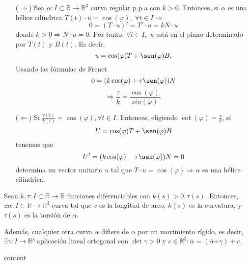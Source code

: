 \begin{dem}
  \begin{enumerate}[label=(\roman*)]
    \item []
    \item [($\Rightarrow$)] Sea $\alpha  : I \subset \mathbb{R} \to \mathbb{R}^{3}$ curva regular p.p.a con $k>0$. Entonces, si $\alpha$ es una hélice cilíndrica $T(t) \cdot u = \cos(\varphi), \; \forall t \in I \Rightarrow$
      \[ 
        0 = (T \cdot u)' = T' \cdot u = kN \cdot u
      \] 
      donde $k>0 \Rightarrow N \cdot u = 0$. Por tanto, $\forall t \in I,$ $u$ está en el plano determinado por $T(t)$ y $B(t)$. Es decir,
      \[ 
        u = \cos(\varphi)T + \sen(\varphi)B .
      \] 
      Usando las fórmulas de Frenet
      \[ 
        0 = (k \cos(\varphi) + \tau \sen(\varphi))N 
      \] 
      \[ 
        \Rightarrow \frac{\tau}{k} = \frac{\cos(\varphi)}{sin(\varphi)}.
      \] 
    \item [($\Leftarrow$)] Si $\frac{\tau(t)}{k(t)} = \cos(\varphi), \forall t \in I$. Entonces, eligiendo $\cot(\varphi) = \frac{\tau}{k}$, si
      \[ 
        U = \cos(\varphi)T + \sen(\varphi)B 
      \] 
      tenemos que
      \[ 
        U' = (k \cos(\varphi) - \tau \sen(\varphi))N = 0 
      \] 
      determina un vector unitario $u$ tal que $T \cdot u = \cos(\varphi) \Rightarrow \alpha$ es una hélice cilíndrica.
  \end{enumerate}
\end{dem}

\begin{theo}
  Sean $k,\tau: I \subset \mathbb{R} \to \mathbb{R}$ funciones diferenciables con $k(s) > 0, \tau(s)$. Entonces, $\exists \alpha  : I \subset \mathbb{R} \to \mathbb{R}^{3}$ curva tal que $s$ es la longitud de arco, $k(s)$ es la curvatura, y $\tau(s)$ es la torsión de $\alpha$.

  Además, cualquier otra curva $\overline{\alpha}$ difiere de $\alpha$ por un movimiento rígido, es decir, $\exists \gamma: I \to \mathbb{R}³$ aplicación lineal ortogonal con $\det \gamma > 0 $ y $c \in \mathbb{R}^{3}: \overline{\alpha} = (\overline{\alpha} \circ \gamma) + c$.
\end{theo}

\begin{dem}
  content
\end{dem}
